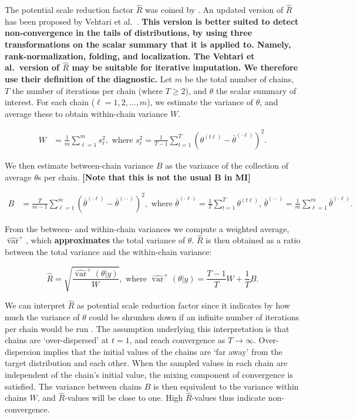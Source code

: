\documentclass[Royal,times,sageh]{sagej}
\begin{document}
The potential scale reduction factor \(\widehat{R}\) was coined by \citet{gelm92}. An updated version of \(\widehat{R}\) has been proposed by Vehtari et al.~\citeyearpar[p.~5]{veht19}. \textbf{This version is better suited to detect non-convergence in the tails of distributions, by using three transformations on the scalar summary that it is applied to. Namely, rank-normalization, folding, and localization. The Vehtari et al.~version of \(\widehat{R}\) may be suitable for iterative imputation. We therefore use their definition of the diagnostic.} Let \(m\) be the total number of chains, \(T\) the number of iterations per chain (where \(T\geq2\)), and \(\theta\) the scalar summary of interest. For each chain (\(\ell = 1, 2, \dots, m\)), we estimate the variance of \(\theta\), and average these to obtain within-chain variance \(W\).

\begin{align*}
W&=\frac{1}{m} \sum_{\ell=1}^{m} s_{\ell}^{2}, \text { where } s_{\ell}^{2}=\frac{1}{T-1} \sum_{t=1}^{T}\left(\theta^{(t \ell)}-\bar{\theta}^{(\cdot \ell)}\right)^{2}. 
\end{align*}

\noindent We then estimate between-chain variance \(B\) as the variance of the collection of average \(\theta\)s per chain. \textbf{{[}Note that this is not the usual B in MI{]}}

\begin{align*}
B&=\frac{T}{m-1} \sum_{\ell=1}^{m}\left(\bar{\theta}^{(\cdot \ell)}-\bar{\theta}^{(\cdot \cdot)}\right)^{2}, \text { where } \bar{\theta}^{(\cdot \ell)}=\frac{1}{T} \sum_{t=1}^{T} \theta^{(t \ell)} \text{, } \bar{\theta}^{(\cdot \cdot)}=\frac{1}{m} \sum_{\ell=1}^{m} \bar{\theta}^{(\cdot \ell)}. 
\end{align*}

\noindent From the between- and within-chain variances we compute a weighted average, \(\widehat{\operatorname{var}}^{+}\), which \textbf{approximates} the total variance of \(\theta\). \(\widehat{R}\) is then obtained as a ratio between the total variance and the within-chain variance:

\begin{equation*}
\widehat{R}=\sqrt{\frac{\widehat{\operatorname{var}}^{+}(\theta | y)}{W}},
\text{ where } \widehat{\operatorname{var}}^{+}(\theta | y)=\frac{T-1}{T} W+\frac{1}{T} B.
\end{equation*}

We can interpret \(\widehat{R}\) as potential scale reduction factor since it indicates by how much the variance of \(\theta\) could be shrunken down if an infinite number of iterations per chain would be run \citep{gelm92}. The assumption underlying this interpretation is that chains are `over-dispersed' at \(t=1\), and reach convergence as \(T \to \infty\). Over-dispersion implies that the initial values of the chains are `far away' from the target distribution and each other. When the sampled values in each chain are independent of the chain's initial value, the mixing component of convergence is satisfied. The variance between chains \(B\) is then equivalent to the variance within chains \(W\), and \(\widehat{R}\)-values will be close to one. High \(\widehat{R}\)-values thus indicate non-convergence.
\end{document}
